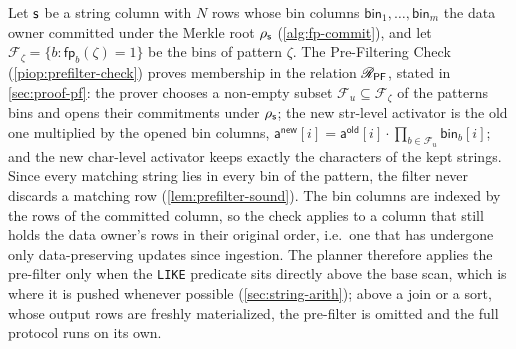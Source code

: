 Let $\mathsf{s}$ be a string column with $N$ rows whose bin columns $\mathsf{bin}_1,\dots,\mathsf{bin}_m$ the data owner committed under the Merkle root $\rho_{\mathsf{s}}$ (\cref{alg:fp-commit}), and let $\mathcal{F}_\zeta=\{b : \mathsf{fp}_b(\zeta)=1\}$ be the bins of pattern $\zeta$. The Pre-Filtering Check (\cref{piop:prefilter-check}) proves membership in the relation $\mathscr{R}_{\mathsf{PF}}$, stated in \cref{sec:proof-pf}: the prover chooses a non-empty subset $\mathcal{F}_u \subseteq \mathcal{F}_\zeta$ of the pattern\textquotesingle s bins and opens their commitments under $\rho_{\mathsf{s}}$; the new str-level activator is the old one multiplied by the opened bin columns, $\mathsf{a}^{\mathsf{new}}[i] = \mathsf{a}^{\mathsf{old}}[i]\cdot\prod_{b\in\mathcal{F}_u}\mathsf{bin}_b[i]$; and the new char-level activator keeps exactly the characters of the kept strings. Since every matching string lies in every bin of the pattern, the filter never discards a matching row (\cref{lem:prefilter-sound}). The bin columns are indexed by the rows of the committed column, so the check applies to a column that still holds the data owner's rows in their original order, i.e.\ one that has undergone only data-preserving updates since ingestion. The planner therefore applies the pre-filter only when the \texttt{LIKE} predicate sits directly above the base scan, which is where it is pushed whenever possible (\cref{sec:string-arith}); above a join or a sort, whose output rows are freshly materialized, the pre-filter is omitted and the full protocol runs on its own.


